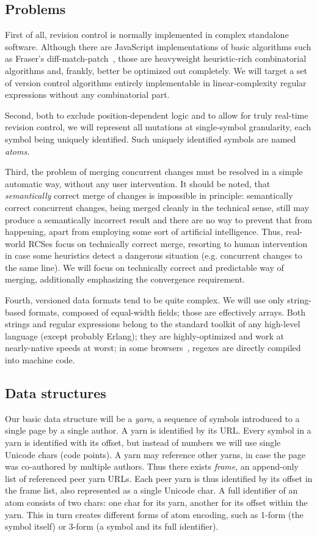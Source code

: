 \documentclass{acm_proc_article-sp}
\begin{document}
\subsection {Problems}
First of all, revision control is normally implemented
in complex standalone software. Although there are JavaScript
implementations of basic algorithms such as Fraser's
diff-match-patch~\cite{diff-match-patch}, those are
heavyweight heuristic-rich combinatorial
algorithms and, frankly, better be optimized out
completely. We will target a set of version control
algorithms entirely implementable in 
linear-complexity regular
expressions without any combinatorial part.

Second, both to exclude position-dependent logic and
to allow for truly real-time revision control, we will
represent all mutations at single-symbol granularity,
each symbol being uniquely identified. Such uniquely
identified symbols are named \emph{atoms}.

Third, the problem of merging concurrent changes must
be resolved in a simple automatic way, without any user
intervention. It should be noted, that
\emph{semantically} correct merge of changes is impossible
in principle: semantically correct concurrent
changes, being merged cleanly in
the technical sense, still may produce a semantically
incorrect result and there are no way to prevent that
from happening,
apart from employing some sort of artificial
intelligence. Thus, real-world RCSes focus on technically
correct merge, resorting to human intervention in case
some heuristics detect a dangerous situation (e.g.
concurrent changes to the same line).
We will focus on technically correct and predictable way
of merging, additionally emphasizing the convergence
requirement.

Fourth, versioned data formats tend to be quite
complex. We will use only string-based formats,
composed of equal-width fields; those are effectively arrays.
Both strings and regular expressions belong to the standard
toolkit of any high-level language (except probably
Erlang); they are highly-optimized and work at nearly-native
speeds at worst; in some browsers~\cite{wrec}, regexes are
directly compiled into machine code.

\subsection{Data structures}

Our basic data structure will be a \emph{yarn}, a sequence of
symbols introduced to a single page by a single author.
A yarn is identified by its URL.
Every symbol in a yarn is identified with its offset,
but instead of numbers we will use single Unicode chars (code points).
A yarn may reference other yarns, in case the page was
co-authored by multiple authors.
Thus there exists \emph{frame}, an append-only list
of referenced peer yarn URLs. Each peer yarn is thus
identified by its offset in the frame list, also represented as
a single Unicode char. A full identifier of an atom
consists of two chars: one char for its yarn, another
for its offset within the yarn. This in turn creates
different forms of atom encoding, such as 1-form
(the symbol itself) or 3-form (a symbol and its full
identifier).
\end{document}
